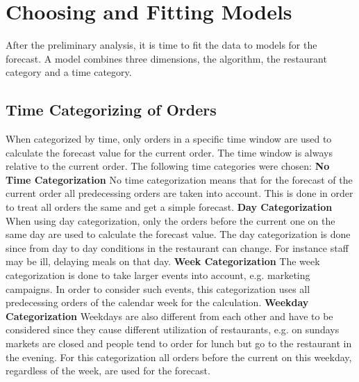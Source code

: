 \section{Choosing and Fitting Models}\label{Choosing and Fitting Models}
After the preliminary analysis, it is time to fit the data to models for the forecast. A model combines three dimensions, the algorithm, the restaurant category and a time category.
\subsection{Time Categorizing of Orders}\label{subsection:Categorizing by Order}
When categorized by time, only orders in a specific time window are used to calculate the forecast value for the current order. The time window is always relative to the current order. The following time categories were chosen:
\newline\newline\textbf{No Time Categorization}\newline
No time categorization means that for the forecast of the current order all predecessing orders are taken into account. This is done in order to treat all orders the same and get a simple forecast.
\newline\newline\textbf{Day Categorization}\newline
When using day categorization, only the orders before the current one on the same day are used to calculate the forecast value. The day categorization is done since from day to day conditions in the restaurant can change. For instance staff may be ill, delaying meals on that day.
\newline\newline\textbf{Week Categorization}\newline
The week categorization is done to take larger events into account, e.g. marketing campaigns. In order to consider such events, this categorization uses all predecessing orders of the calendar week for the calculation.
\newline\newline\textbf{Weekday Categorization}\newline
Weekdays are also different from each other and have to be considered since they cause different utilization of restaurants, e.g. on sundays markets are closed and people tend to order for lunch but go to the restaurant in the evening. For this categorization all orders before the current on this weekday, regardless of the week, are used for the forecast.
